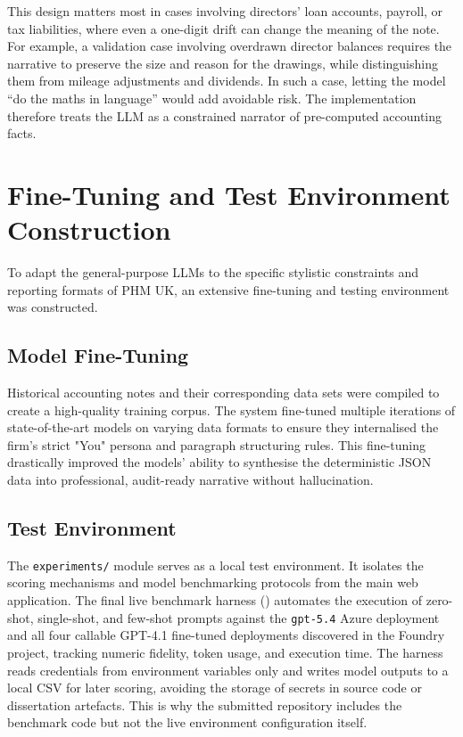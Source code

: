 This design matters most in cases involving directors' loan accounts, payroll, or tax liabilities, where even a one-digit drift can change the meaning of the note. For example, a validation case involving overdrawn director balances requires the narrative to preserve the size and reason for the drawings, while distinguishing them from mileage adjustments and dividends. In such a case, letting the model ``do the maths in language'' would add avoidable risk. The implementation therefore treats the LLM as a constrained narrator of pre-computed accounting facts.

\section{Fine-Tuning and Test Environment Construction}
To adapt the general-purpose LLMs to the specific stylistic constraints and reporting formats of PHM UK, an extensive fine-tuning and testing environment was constructed.

\subsection{Model Fine-Tuning}
Historical accounting notes and their corresponding data sets were compiled to create a high-quality training corpus. The system fine-tuned multiple iterations of state-of-the-art models on varying data formats to ensure they internalised the firm's strict "You" persona and paragraph structuring rules. This fine-tuning drastically improved the models' ability to synthesise the deterministic JSON data into professional, audit-ready narrative without hallucination.

\subsection{Test Environment}
The \texttt{experiments/} module serves as a local test environment. It isolates the scoring mechanisms and model benchmarking protocols from the main web application. The final live benchmark harness () automates the execution of zero-shot, single-shot, and few-shot prompts against the \texttt{gpt-5.4} Azure deployment and all four callable GPT-4.1 fine-tuned deployments discovered in the Foundry project, tracking numeric fidelity, token usage, and execution time. The harness reads credentials from environment variables only and writes model outputs to a local CSV for later scoring, avoiding the storage of secrets in source code or dissertation artefacts. This is why the submitted repository includes the benchmark code but not the live environment configuration itself.

